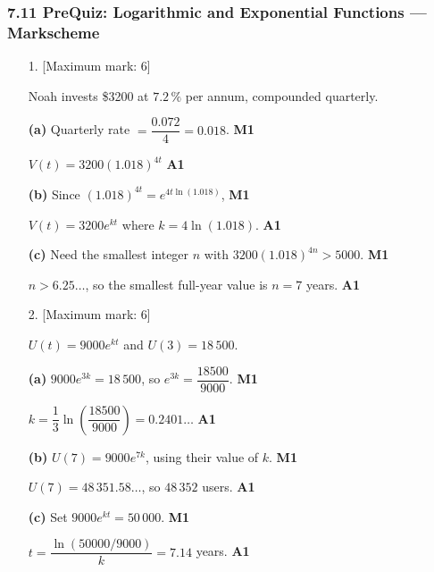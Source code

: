 \documentclass[12pt, twoside]{article}
\begin{document}
\subsubsection*{7.11 PreQuiz: Logarithmic and Exponential Functions ---
Markscheme}

\begin{enumerate}[itemsep=0.3cm]

\item[1.] [Maximum mark: 6]

Noah invests \$3200 at $7.2\,\%$ per annum, compounded quarterly.

\medskip

\textbf{(a)} Quarterly rate $=\dfrac{0.072}{4}=0.018$. \hfill \textbf{M1}

$V(t)=3200(1.018)^{4t}$ \hfill \textbf{A1}

\medskip

\textbf{(b)} Since $(1.018)^{4t}=e^{4t\ln(1.018)}$,
\hfill \textbf{M1}

$V(t)=3200e^{kt}$ where $k=4\ln(1.018)$. \hfill \textbf{A1}

\medskip

\textbf{(c)} Need the smallest integer $n$ with
$3200(1.018)^{4n}>5000$. \hfill \textbf{M1}

$n>6.25\ldots$, so the smallest full-year value is $n=7$ years.
\hfill \textbf{A1}

\newpage

\item[2.] [Maximum mark: 6]

$U(t)=9000e^{kt}$ and $U(3)=18\,500$.

\medskip

\textbf{(a)} $9000e^{3k}=18\,500$, so $e^{3k}=\dfrac{18500}{9000}$.
\hfill \textbf{M1}

$k=\dfrac{1}{3}\ln\!\left(\dfrac{18500}{9000}\right)
=0.2401\ldots$ \hfill \textbf{A1}

\medskip

\textbf{(b)} $U(7)=9000e^{7k}$, using their value of $k$.
\hfill \textbf{M1}

$U(7)=48\,351.58\ldots$, so $48\,352$ users. \hfill \textbf{A1}

\medskip

\textbf{(c)} Set $9000e^{kt}=50\,000$. \hfill \textbf{M1}

$t=\dfrac{\ln(50000/9000)}{k}=7.14$ years. \hfill \textbf{A1}

\end{enumerate}
\end{document}
